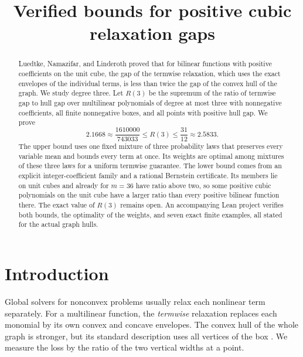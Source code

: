\documentclass[11pt]{article}
\title{Verified bounds for positive cubic relaxation gaps}
\author{}
\date{}
\theoremstyle{remark}
\begin{document}
\maketitle
\begin{abstract}
Luedtke, Namazifar, and Linderoth proved that for bilinear functions
with positive coefficients on the unit cube, the gap of the termwise
relaxation, which uses the exact envelopes of the individual terms, is
less than twice the gap of the convex hull of the graph. We study degree
three.
Let $R(3)$ be the supremum of the ratio of termwise gap to hull gap over
multilinear polynomials of degree at most three with nonnegative
coefficients, all finite nonnegative boxes, and all points with positive
hull gap. We prove
\[
 2.1668\approx\frac{1610000}{743033}\le R(3)\le\frac{31}{12}\approx2.5833.
\]
The upper bound uses one fixed mixture of three probability laws that
preserves every variable mean and bounds every term at once. Its weights
are optimal among mixtures of these three laws for a uniform termwise
guarantee. The lower bound comes from an explicit integer-coefficient
family and a rational Bernstein certificate. Its members lie on unit
cubes and already for $m=36$ have ratio above two, so some positive cubic
polynomials on the unit cube have a larger ratio than every positive
bilinear function there. The exact value of $R(3)$ remains open. An
accompanying Lean project verifies both bounds, the optimality of the
weights, and seven exact finite examples, all stated for the actual graph
hulls.
\end{abstract}

\section{Introduction}\label{sec:intro}
Global solvers for nonconvex problems usually relax each nonlinear term
separately. For a multilinear function, the \emph{termwise} relaxation
replaces each monomial by its own convex and concave envelopes. The
convex hull of the whole graph is stronger, but its standard description
uses all vertices of the box \citep{Luedtke2012}. We measure the loss by
the ratio of the two vertical widths at a point.
\end{document}
